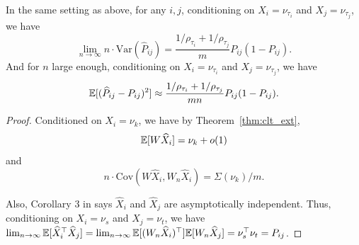 \begin{lemma}
In the same setting as above, for any $i, j$, conditioning on $X_i = \nu_{\tau_i}$ and $X_j = \nu_{\tau_j}$, we have
\[
	\lim_{n \to \infty} n \cdot \mathrm{Var}(\hat{P}_{ij}) =
    \frac{1/\rho_{\tau_i} + 1/\rho_{\tau_j}}{m} P_{ij} (1 - P_{ij}).
\]
And for $n$ large enough, conditioning on $X_i = \nu_{\tau_i}$ and $X_j = \nu_{\tau_j}$, we have
\[
	\mathbb{E}[(\widehat{P}_{ij} - P_{ij})^2] \approx
    \frac{1/\rho_{\tau_i} + 1/\rho_{\tau_j}}{m n} P_{ij}(1-P_{ij}).
\]
\end{lemma}
\begin{proof}
Conditioned on $X_i = \nu_k$, we have by Theorem~\ref{thm:clt_ext},
\[
	\mathbb{E}[W \widehat{X}_i] = \nu_k+o(1)
\]
and
\[
	n \cdot \mathrm{Cov}(W \hat{X}_i, W_n \hat{X}_i) = \Sigma(\nu_k)/m.
\]


Also, Corollary 3 in \citet{athreya2016limit} says $\hat{X}_i$ and $\hat{X}_j$ are asymptotically independent. Thus, conditioning on $X_i = \nu_s$ and $X_j = \nu_t$, we have $\lim_{n\to\infty}\mathbb{E}[\widehat{X}_i^{\top} \widehat{X}_j] = \lim_{n\to\infty}\mathbb{E}[(W_n \widehat{X}_i)^{\top}] \mathbb{E}[W_n \widehat{X}_j] = \nu_s^{\top} \nu_t = P_{ij}$.


\end{proof}
